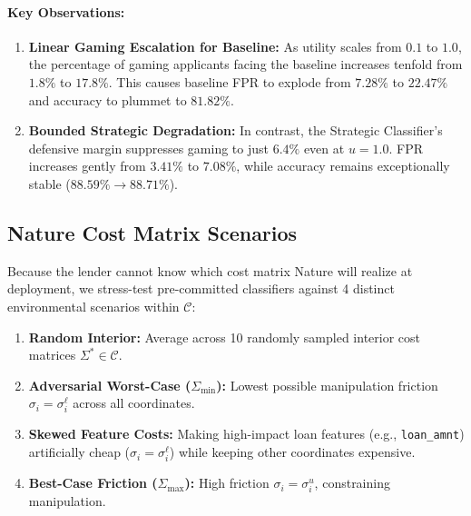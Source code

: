 \documentclass[10pt, letterpaper]{article}
\newcommand{\C}{\mathcal{C}}
\begin{document}
\paragraph{Key Observations:}
\begin{enumerate}[leftmargin=*]
    \item \textbf{Linear Gaming Escalation for Baseline:} As utility scales from $0.1$ to $1.0$, the percentage of gaming applicants facing the baseline increases tenfold from $1.8\%$ to $17.8\%$. This causes baseline FPR to explode from $7.28\%$ to $22.47\%$ and accuracy to plummet to $81.82\%$.
    \item \textbf{Bounded Strategic Degradation:} In contrast, the Strategic Classifier's defensive margin suppresses gaming to just $6.4\%$ even at $u=1.0$. FPR increases gently from $3.41\%$ to $7.08\%$, while accuracy remains exceptionally stable ($88.59\% \to 88.71\%$).
\end{enumerate}

\subsection{Nature Cost Matrix Scenarios}
\label{sec:pillar3}

Because the lender cannot know which cost matrix Nature will realize at deployment, we stress-test pre-committed classifiers against 4 distinct environmental scenarios within $\C$:
\begin{enumerate}[leftmargin=*]
    \item \textbf{Random Interior:} Average across 10 randomly sampled interior cost matrices $\Sigma^* \in \C$.
    \item \textbf{Adversarial Worst-Case ($\Sigma_{\min}$):} Lowest possible manipulation friction $\sigma_i = \sigma_i^\ell$ across all coordinates.
    \item \textbf{Skewed Feature Costs:} Making high-impact loan features (e.g., \texttt{loan\_amnt}) artificially cheap ($\sigma_i = \sigma_i^\ell$) while keeping other coordinates expensive.
    \item \textbf{Best-Case Friction ($\Sigma_{\max}$):} High friction $\sigma_i = \sigma_i^u$, constraining manipulation.
\end{enumerate}
\end{document}
